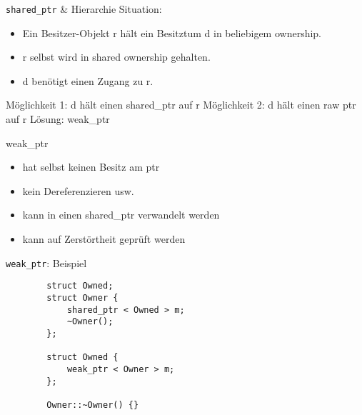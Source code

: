 \begin{frame}{ \texttt{shared\_ptr} \& Hierarchie }
	Situation:
	\begin{itemize}
		\item Ein Besitzer-Objekt r hält ein Besitztum d in beliebigem ownership.
		\item r selbst wird in shared ownership gehalten.
		\item d benötigt einen Zugang zu r.
	\end{itemize}
	
	\pause
	Möglichkeit 1: d hält einen shared\_ptr auf r
	\pause
	Möglichkeit 2: d hält einen raw ptr auf r
	\pause
	Lösung: weak\_ptr
	
	\begin{block}{weak\_ptr}
		\begin{itemize}
			\item hat selbst keinen Besitz am ptr
			\item kein Dereferenzieren usw.
			\item kann in einen shared\_ptr verwandelt werden
			\item kann auf Zerstörtheit geprüft werden
		\end{itemize}
	\end{block}
\end{frame}

\begin{frame}[fragile]{ \texttt{weak\_ptr}: Beispiel }
	\begin{lstlisting}
		struct Owned;
		struct Owner {
			shared_ptr < Owned > m;
			~Owner();
		};
		
		struct Owned {
			weak_ptr < Owner > m;
		};
		
		Owner::~Owner() {}
	\end{lstlisting}
\end{frame}
